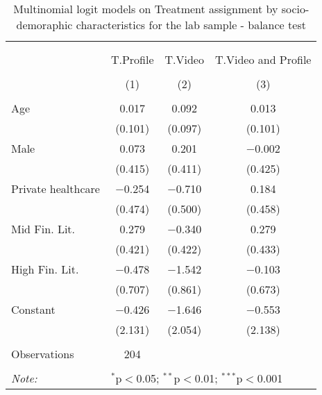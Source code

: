 
\begin{table}[H] \centering 
  \caption{Multinomial logit models on Treatment assignment by socio-demoraphic characteristics for the lab sample - balance test} 
  \label{tbl:balance_lab} 
\begin{tabular}{@{\extracolsep{5pt}}lccc} 
\\[-1.8ex]\hline 
\hline \\[-1.8ex] 
\\[-1.8ex] & T.Profile & T.Video & T.Video and Profile \\ 
\\[-1.8ex] & (1) & (2) & (3)\\ 
\hline \\[-1.8ex] 
 Age & 0.017 & 0.092 & 0.013 \\ 
  & (0.101) & (0.097) & (0.101) \\ 
  Male & 0.073 & 0.201 & $-$0.002 \\ 
  & (0.415) & (0.411) & (0.425) \\ 
  Private healthcare & $-$0.254 & $-$0.710 & 0.184 \\ 
  & (0.474) & (0.500) & (0.458) \\ 
  Mid Fin. Lit. & 0.279 & $-$0.340 & 0.279 \\ 
  & (0.421) & (0.422) & (0.433) \\ 
  High Fin. Lit. & $-$0.478 & $-$1.542 & $-$0.103 \\ 
  & (0.707) & (0.861) & (0.673) \\ 
  Constant & $-$0.426 & $-$1.646 & $-$0.553 \\ 
  & (2.131) & (2.054) & (2.138) \\ 
 \hline \\[-1.8ex] 
Observations & 204 &  &  \\ 
\hline 
\hline \\[-1.8ex] 
\textit{Note:}  & \multicolumn{3}{l}{$^{*}$p$<$0.05; $^{**}$p$<$0.01; $^{***}$p$<$0.001} \\ 
\end{tabular} 
\end{table} 
